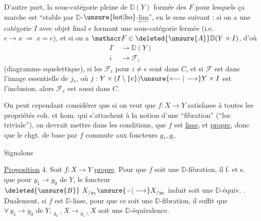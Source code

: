 D'autre part, la sous-catégorie pleine  de $\mathbb D(Y)$ formée des $F$ pour lesquels ça marche est  ``stable par $\mathbb D$-$\unsure{\mathrm{hot}|\mathrm{ho}}$-$\underset{\longleftarrow}{\mathrm{lim}}$'', en le sens suivant : si on a une catégorie $I$ avec objet final $e$ formant une sous-catégorie fermée (i.e. $e\longrightarrow x\ \Longrightarrow\ x=e$), et si on a $\mathscr F\in\deleted{\unsure{A}}\mathbb D(Y\times I)$, d'où
\[
\begin{aligned}
I^\circ&\longrightarrow\mathbb D(Y)\\
i&\longrightarrow\mathscr F_i
\end{aligned}
\]
(diagramme squelettique), si les $\mathscr F_i$ pour $i\ne e$ sont dans $C$, et si $\mathscr F$ est dans l'image essentielle de $j_*$, où $j:Y\times(I\setminus\{e\})\unsure{\longleftarrow|\longrightarrow}Y\times I$ est l'inclusion, alors $\mathscr F_e$ est aussi dans $C$.

On peut cependant considérer que si on veut que $f:X\longrightarrow Y$ satisfasse à toutes les propriétés coh. et hom. qui s'attachent à la notion d'une ``fibration'' (``loc triviale''), on devrait mettre dans les conditions, que $f$ est \uline{lisse}, et \uline{propre}, donc que le chgt. de base par $f$ commute aux foncteurs $g_*,g_!$.

 Signalons

\uline{Proposition} 4. Soit $f:X\longrightarrow Y$ \uline{propre}. Pour que $f$ soit une $\mathbb D$-fibration, il f. et s. que pour  $y_1\longrightarrow y_0$ de $Y$, le foncteur $\deleted{\unsure{B}}\ X_{/y_1}\unsure{-|\longrightarrow}X_{/y_0}$ induit soit une $\mathbb D$-équiv. . Dualement, si $f$ est $\mathbb D$-lisse, pour que ce soit une $\mathbb D$-fibration, il  suffit que $\forall\, y_1\longrightarrow y_0$ de $Y$, $ {}_{y_0\backslash}X\longrightarrow {}_{y_1\backslash}X$ soit une $\mathbb D$-équivalence.


